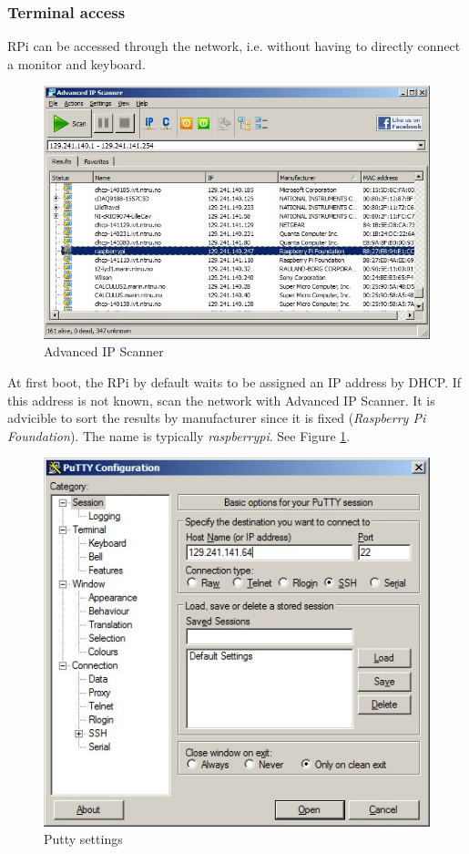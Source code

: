 \documentclass[a4paper,english]{report}
\begin{document}
\subsubsection{Terminal access}\label{subsec: Terminal access}
RPi can be accessed through the network, i.e. without having to directly connect a monitor and keyboard.
\begin{figure}[htb!]
	\centering \includegraphics[scale=0.45]{fig/advancedIPscanner} \caption{Advanced IP Scanner}
	\label{fig: Advanced IP Scanner} 
\end{figure} 
At first boot, the RPi by default waits to be assigned an IP address by DHCP. If this address is not known, scan the network with Advanced IP Scanner. It is advicible to sort the results by manufacturer since it is fixed (\textit{Raspberry Pi Foundation}). The name is typically \emph{raspberrypi}. See Figure \ref{fig: Advanced IP Scanner}.
\begin{figure}[htb!]
	\centering \includegraphics[scale=0.45]{fig/Rpi_remote_access1} \caption{Putty settings}
	\label{fig: Putty settings} 
\end{figure}
\end{document}
